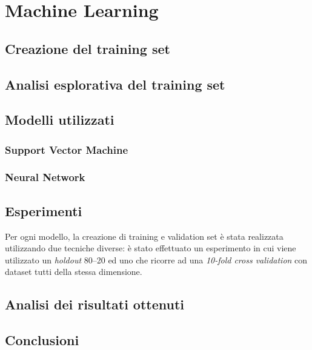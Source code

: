 \setcounter{chapter}{0}
\part{Machine Learning}
\chapter{Creazione del training set}

\chapter{Analisi esplorativa del training set}

\chapter{Modelli utilizzati}


\section{Support Vector Machine}

\section{Neural Network}

\chapter{Esperimenti}
Per ogni modello, la creazione di training e validation set è stata realizzata 
utilizzando due tecniche diverse: è stato effettuato un esperimento in cui 
viene utilizzato un \textit{holdout} 80--20 ed uno che ricorre ad una 
\textit{10-fold cross validation} con dataset tutti della stessa dimensione.


\chapter{Analisi dei risultati ottenuti}

\chapter{Conclusioni}
